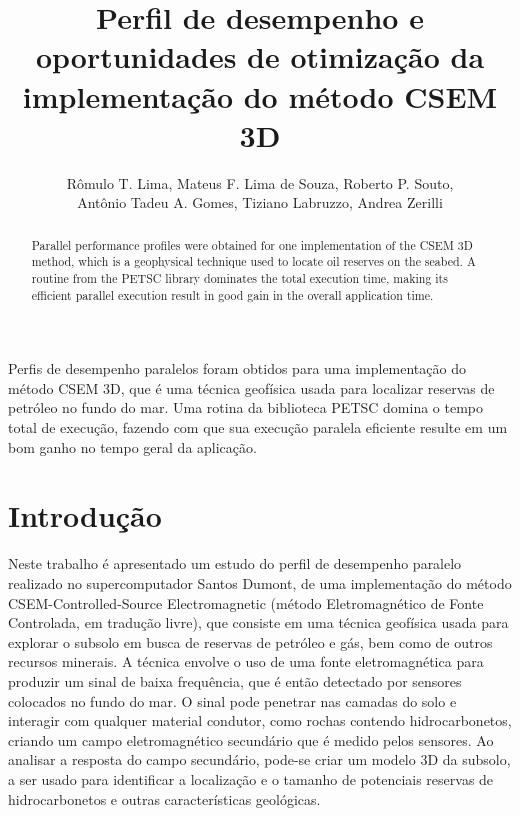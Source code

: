 \documentclass[12pt]{article}
\title{Perfil de desempenho e oportunidades de otimização da implementação do método CSEM 3D}
\author{Rômulo T. Lima\inst{1,2}, Mateus F. Lima de Souza\inst{1,3}, Roberto P. Souto\inst{1}, \\ 
        Antônio Tadeu A. Gomes\inst{1}, Tiziano Labruzzo\inst{1,4}, Andrea Zerilli\inst{1,4}}
\begin{document}
 

\maketitle

\begin{abstract}
Parallel performance profiles were obtained for one implementation of the CSEM 3D method, which is a geophysical technique used to locate oil reserves on the seabed. A routine from the PETSC library dominates the total execution time, making its efficient parallel execution result in good gain in the overall application time.
\end{abstract}
     
\begin{resumo} 
Perfis de desempenho paralelos foram obtidos para uma implementação do método CSEM 3D, que é uma técnica geofísica usada para localizar reservas de petróleo no fundo do mar. Uma rotina da biblioteca PETSC domina o tempo total de execução, fazendo com que sua execução paralela eficiente resulte em um bom ganho no tempo geral da aplicação. 
\end{resumo}


\section{Introdução}
\label{sec:intro}
%
Neste trabalho é apresentado um estudo do perfil de desempenho paralelo realizado no supercomputador Santos Dumont, de uma implementação do método CSEM-Controlled-Source Electromagnetic (método Eletromagnético de Fonte Controlada, em tradução livre)\cite{zerilli2014broadband}, que consiste em uma técnica geofísica usada para explorar o subsolo em busca de reservas de petróleo e gás, bem como de outros recursos minerais. A técnica envolve o uso de uma fonte eletromagnética para produzir um sinal de baixa frequência, que é então detectado por sensores colocados no fundo do mar. O sinal pode penetrar nas camadas do solo e interagir com qualquer material condutor, como rochas contendo hidrocarbonetos, criando um campo eletromagnético secundário que é medido pelos sensores. Ao analisar a resposta do campo secundário, pode-se criar um modelo 3D da subsolo, a ser usado para identificar a localização e o tamanho de potenciais reservas de hidrocarbonetos e outras características geológicas.
\end{document}
